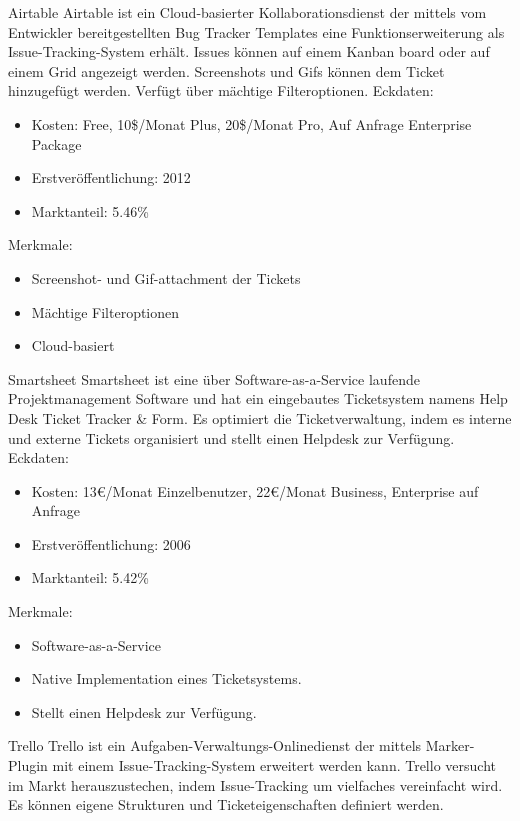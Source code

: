 Airtable				
Airtable ist ein Cloud-basierter Kollaborationsdienst der mittels vom Entwickler bereitgestellten Bug Tracker Templates eine Funktionserweiterung als Issue-Tracking-System erhält. Issues können auf einem Kanban board oder auf einem Grid angezeigt werden. Screenshots und Gifs können dem Ticket hinzugefügt werden. Verfügt über mächtige Filteroptionen.	
Eckdaten:
\begin{itemize}
	\item Kosten: Free, 10\$/Monat Plus, 20\$/Monat Pro, Auf Anfrage Enterprise Package
	\item Erstveröffentlichung: 2012 
	\item Marktanteil: 5.46\%
\end{itemize}				
Merkmale:
\begin{itemize}
	\item Screenshot- und Gif-attachment der Tickets
	\item Mächtige Filteroptionen
	\item Cloud-basiert
\end{itemize}
Smartsheet				
Smartsheet ist eine über Software-as-a-Service laufende Projektmanagement Software und hat ein eingebautes Ticketsystem namens Help Desk Ticket Tracker \& Form. Es optimiert die Ticketverwaltung, indem es interne und externe Tickets organisiert und stellt einen Helpdesk zur Verfügung. 
Eckdaten:
\begin{itemize}
	\item Kosten: 13€/Monat Einzelbenutzer, 22€/Monat Business, Enterprise auf Anfrage
	\item Erstveröffentlichung: 2006
	\item Marktanteil: 5.42\%
\end{itemize}		
Merkmale:
\begin{itemize}
	\item Software-as-a-Service
	\item Native Implementation eines Ticketsystems.
	\item Stellt einen Helpdesk zur Verfügung.
\end{itemize}
Trello
Trello ist ein Aufgaben-Verwaltungs-Onlinedienst der mittels Marker-Plugin mit einem Issue-Tracking-System erweitert werden kann. Trello versucht im Markt herauszustechen, indem Issue-Tracking um vielfaches vereinfacht wird. Es können eigene Strukturen und Ticketeigenschaften definiert werden. 
